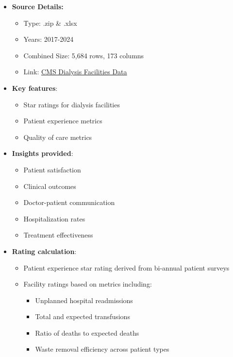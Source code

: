 \documentclass[
  11pt,
  letterpaper,
  DIV=11,
  numbers=noendperiod]{scrartcl}
\providecommand{\tightlist}{%
  \setlength{\itemsep}{0pt}\setlength{\parskip}{0pt}}\usepackage{longtable,booktabs,array}
\begin{document}
\begin{itemize}
\tightlist
\item
  \textbf{Source Details:}

  \begin{itemize}
  \tightlist
  \item
    Type: .zip \& .xlsx
  \item
    Years: 2017-2024
  \item
    Combined Size: 5,684 rows, 173 columns
  \item
    Link:
    \href{https://data.cms.gov/provider-data/topics/dialysis-facilities}{CMS
    Dialysis Facilities Data}
  \end{itemize}
\item
  \textbf{Key features}:

  \begin{itemize}
  \tightlist
  \item
    Star ratings for dialysis facilities
  \item
    Patient experience metrics
  \item
    Quality of care metrics
  \end{itemize}
\item
  \textbf{Insights provided}:

  \begin{itemize}
  \tightlist
  \item
    Patient satisfaction
  \item
    Clinical outcomes
  \item
    Doctor-patient communication
  \item
    Hospitalization rates
  \item
    Treatment effectiveness
  \end{itemize}
\item
  \textbf{Rating calculation}:

  \begin{itemize}
  \tightlist
  \item
    Patient experience star rating derived from bi-annual patient
    surveys
  \item
    Facility ratings based on metrics including:

    \begin{itemize}
    \tightlist
    \item
      Unplanned hospital readmissions
    \item
      Total and expected transfusions
    \item
      Ratio of deaths to expected deaths
    \item
      Waste removal efficiency across patient types
    \end{itemize}
  \end{itemize}
\end{itemize}
\end{document}
